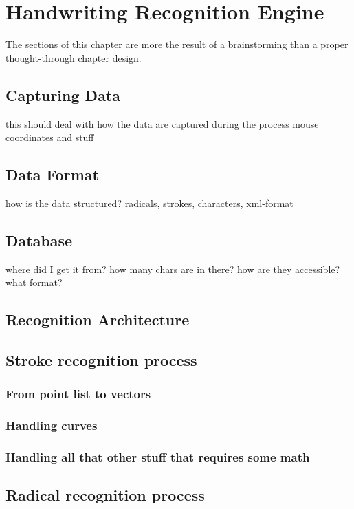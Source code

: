
\chapter{Handwriting Recognition Engine}
The sections of this chapter are more the result of a brainstorming 
than a  proper thought-through chapter design.

\section{Capturing Data}
this should deal with how the data are captured during the process
mouse coordinates and stuff

\section{Data Format}
how is the data structured? radicals, strokes, characters, xml-format

\section{Database}
where did I get it from? how many chars are in there?
how are they accessible? what format?

\section{Recognition Architecture}

\section{Stroke recognition process}
\subsection{From point list to vectors}
\subsection{Handling curves}
\subsection{Handling all that other stuff that requires some math}

\section{Radical recognition process}
